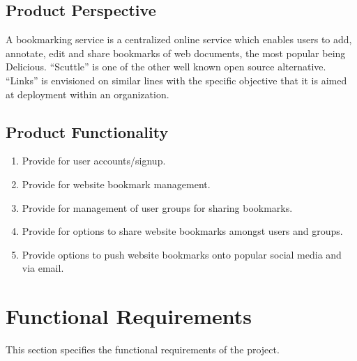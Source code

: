 \documentclass[11pt]{report} %
\begin{document}
\section{Product Perspective}
A bookmarking service is a centralized online service which enables users to add, annotate, edit and share bookmarks of web documents, the most popular being Delicious. “Scuttle” is one of the other well known open source alternative. “Links” is envisioned on similar lines with the specific objective that it is aimed at deployment within an organization.
\section{Product Functionality}
\begin{enumerate}
\item
Provide for user accounts/signup.
\item
Provide for website bookmark management.
\item
Provide for management of user groups for sharing bookmarks.
\item
Provide for options to share website bookmarks amongst users and groups.
\item
Provide options to push website bookmarks onto popular social media and via email.
\end{enumerate}

\maketitle
\chapter{Functional Requirements}
This section specifies the functional requirements of the project.
\end{document}

